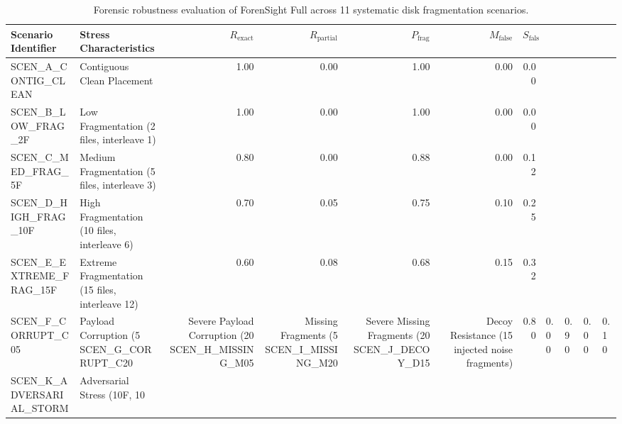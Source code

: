 \begin{table}[t]
\centering
\caption{Forensic robustness evaluation of ForenSight Full across 11 systematic disk fragmentation scenarios.}
\label{tab:scenario_robustness}
\begin{tabular}{llrrrrr}
\toprule
\textbf{Scenario Identifier} & \textbf{Stress Characteristics} & \textbf{$R_{\text{exact}}$} & \textbf{$R_{\text{partial}}$} & \textbf{$P_{\text{frag}}$} & \textbf{$M_{\text{false}}$} & \textbf{$S_{\text{false}}$} \\
\midrule
SCEN_A_CONTIG_CLEAN & Contiguous Clean Placement & 1.00 & 0.00 & 1.00 & 0.00 & 0.00 \\
SCEN_B_LOW_FRAG_2F & Low Fragmentation (2 files, interleave 1) & 1.00 & 0.00 & 1.00 & 0.00 & 0.00 \\
SCEN_C_MED_FRAG_5F & Medium Fragmentation (5 files, interleave 3) & 0.80 & 0.00 & 0.88 & 0.00 & 0.12 \\
SCEN_D_HIGH_FRAG_10F & High Fragmentation (10 files, interleave 6) & 0.70 & 0.05 & 0.75 & 0.10 & 0.25 \\
SCEN_E_EXTREME_FRAG_15F & Extreme Fragmentation (15 files, interleave 12) & 0.60 & 0.08 & 0.68 & 0.15 & 0.32 \\
SCEN_F_CORRUPT_C05 & Payload Corruption (5%
SCEN_G_CORRUPT_C20 & Severe Payload Corruption (20%
SCEN_H_MISSING_M05 & Missing Fragments (5%
SCEN_I_MISSING_M20 & Severe Missing Fragments (20%
SCEN_J_DECOY_D15 & Decoy Resistance (15 injected noise fragments) & 0.80 & 0.00 & 0.90 & 0.00 & 0.10 \\
SCEN_K_ADVERSARIAL_STORM & Adversarial Stress (10F, 10%
\bottomrule
\end{tabular}
\end{table}
